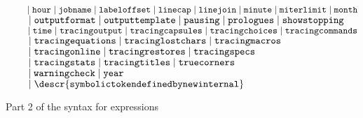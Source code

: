 \begin{figure}[htp]
\begin{ctabbing}
$\tt \qquad \;|\; hour \;|\; jobname \;|\; labeloffset \;|\; linecap \;|\; linejoin
\;|\; minute \;|\; miterlimit \;|\; month$\\
$\tt \qquad \;|\; outputformat \;|\; outputtemplate \;|\; pausing \;|\; prologues \;|\; showstopping$\\
$\tt \qquad \;|\; time \;|\; tracingoutput \;|\; tracingcapsules \;|\; tracingchoices \;|\; tracingcommands$\\
$\tt \qquad \;|\; tracingequations \;|\; tracinglostchars \;|\; tracingmacros$\\
$\tt \qquad \;|\; tracingonline \;|\; tracingrestores \;|\; tracingspecs$\\
$\tt \qquad \;|\; tracingstats \;|\; tracingtitles \;|\; truecorners$\\
$\tt \qquad \;|\; warningcheck \;|\; year$\\
$\tt \qquad \;|\; \descr{symbolic token defined by {\tt newinternal}}$
\end{ctabbing}
\caption{Part 2 of the syntax for expressions}
%
%
%
\label{syexpr2}
\end{figure}

